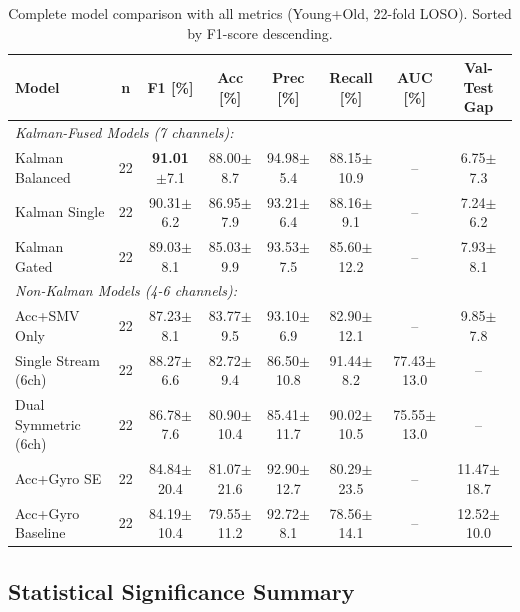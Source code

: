 \documentclass{article}
\begin{document}
\begin{table}[htbp]
    \centering
    \caption{Complete model comparison with all metrics (Young+Old, 22-fold LOSO). Sorted by F1-score descending.}
    \label{tab:master_comparison}
    \small
    \begin{tabular}{lccccccc}
        \toprule
        \textbf{Model} & \textbf{n} & \textbf{F1 [\%]} & \textbf{Acc [\%]} & \textbf{Prec [\%]} & \textbf{Recall [\%]} & \textbf{AUC [\%]} & \textbf{Val-Test Gap} \\
        \midrule
        \multicolumn{8}{l}{\textit{Kalman-Fused Models (7 channels):}} \\
        Kalman Balanced & 22 & \textbf{91.01}$\pm$7.1 & 88.00$\pm$8.7 & 94.98$\pm$5.4 & 88.15$\pm$10.9 & -- & 6.75$\pm$7.3 \\
        Kalman Single & 22 & 90.31$\pm$6.2 & 86.95$\pm$7.9 & 93.21$\pm$6.4 & 88.16$\pm$9.1 & -- & 7.24$\pm$6.2 \\
        Kalman Gated & 22 & 89.03$\pm$8.1 & 85.03$\pm$9.9 & 93.53$\pm$7.5 & 85.60$\pm$12.2 & -- & 7.93$\pm$8.1 \\
        \midrule
        \multicolumn{8}{l}{\textit{Non-Kalman Models (4-6 channels):}} \\
        Acc+SMV Only & 22 & 87.23$\pm$8.1 & 83.77$\pm$9.5 & 93.10$\pm$6.9 & 82.90$\pm$12.1 & -- & 9.85$\pm$7.8 \\
        Single Stream (6ch) & 22 & 88.27$\pm$6.6 & 82.72$\pm$9.4 & 86.50$\pm$10.8 & 91.44$\pm$8.2 & 77.43$\pm$13.0 & -- \\
        Dual Symmetric (6ch) & 22 & 86.78$\pm$7.6 & 80.90$\pm$10.4 & 85.41$\pm$11.7 & 90.02$\pm$10.5 & 75.55$\pm$13.0 & -- \\
        Acc+Gyro SE & 22 & 84.84$\pm$20.4 & 81.07$\pm$21.6 & 92.90$\pm$12.7 & 80.29$\pm$23.5 & -- & 11.47$\pm$18.7 \\
        Acc+Gyro Baseline & 22 & 84.19$\pm$10.4 & 79.55$\pm$11.2 & 92.72$\pm$8.1 & 78.56$\pm$14.1 & -- & 12.52$\pm$10.0 \\
        \bottomrule
    \end{tabular}
\end{table}

\subsection{Statistical Significance Summary}
\end{document}
